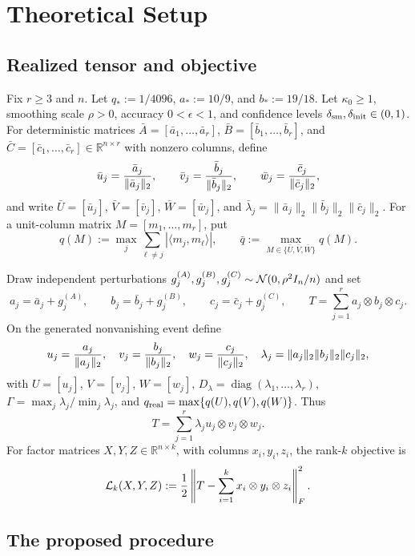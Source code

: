 \section{Theoretical Setup}\label{sec:setup}

\subsection{Realized tensor and objective}

Fix $r\ge 3$ and $n$. Let $q_*:=1/4096$, $a_*:=10/9$, and
$b_*:=19/18$. Let $\kappa _0\ge1$, smoothing scale $\rho>0$,
accuracy $0<\epsilon<1$, and confidence levels
$\delta_{\rm sm},\delta_{\rm init}\in(0,1)$. For deterministic matrices
$\bar A=[\bar a_1,\ldots,\bar a_r]$,
$\bar B=[\bar b_1,\ldots,\bar b_r]$, and
$\bar C=[\bar c_1,\ldots,\bar c_r]\in\mathbb R^{n\times r}$ with nonzero
columns, define
\[
 \bar u_j={\bar a_j\over\|\bar a_j\|_2},\qquad
 \bar v_j={\bar b_j\over\|\bar b_j\|_2},\qquad
 \bar w_j={\bar c_j\over\|\bar c_j\|_2},
\]
and write $\bar U=[\bar u_j]$, $\bar V=[\bar v_j]$,
$\bar W=[\bar w_j]$, and
$\bar\lambda_j=\|\bar a_j\|_2\|\bar b_j\|_2\|\bar c_j\|_2$. For a
unit-column matrix $M=[m_1,\ldots,m_r]$, put
\[
 q(M):=\max_j\sum_{\ell\ne j}|\langle m_j,m_\ell\rangle|,
 \qquad \bar q:=\max_{M\in\{\bar U,\bar V,\bar W\}}q(M).
\]

Draw independent perturbations
$g_j^{(A)},g_j^{(B)},g_j^{(C)}\sim{\cal N}(0,\rho^2I_n/n)$ and set
\[
 a_j=\bar a_j+g_j^{(A)},\qquad b_j=\bar b_j+g_j^{(B)},\qquad
 c_j=\bar c_j+g_j^{(C)},
 \qquad T=\sum_{j=1}^r a_j\otimes b_j\otimes c_j.
\]
On the generated nonvanishing event define
\[
 u_j={a_j\over\|a_j\|_2},\quad v_j={b_j\over\|b_j\|_2},\quad
 w_j={c_j\over\|c_j\|_2},\quad
 \lambda_j=\|a_j\|_2\|b_j\|_2\|c_j\|_2,
\]
with $U=[u_j]$, $V=[v_j]$, $W=[w_j]$,
$D_\lambda=\operatorname{diag}(\lambda_1,\ldots,\lambda_r)$,
$\Gamma=\max_j\lambda_j/\min_j\lambda_j$, and
$q_{\rm real}=\max\{q(U),q(V),q(W)\}$. Thus
\[
 T=\sum_{j=1}^r\lambda_j u_j\otimes v_j\otimes w_j.
\]
For factor matrices $X,Y,Z\in\mathbb R^{n\times k}$, with columns
$x_i,y_i,z_i$, the rank-$k$ objective is
\[
 {\cal L}_k(X,Y,Z):={1\over2}\left\|T-
 \sum_{i=1}^k x_i\otimes y_i\otimes z_i\right\|_F^2.
\]

\subsection{The proposed procedure}

